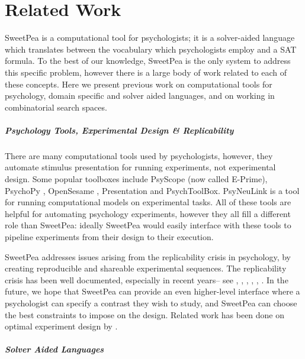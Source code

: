 

\chapter{Related Work}

SweetPea is a computational tool for psychologists; it is a solver-aided language which translates between the vocabulary which psychologists employ and a SAT formula. To the best of our knowledge, SweetPea is the only system to address this specific problem, however there is a large body of work related to each of these concepts. Here we present previous work on computational tools for psychology, domain specific and solver aided languages, and on working in combinatorial search spaces.

\paragraph*{Psychology Tools, Experimental Design \& Replicability}

There are many computational tools used by psychologists, however, they automate stimulus presentation for running experiments, not experimental design. Some popular toolboxes include PsyScope \cite{cohen1993psyscope} (now called E-Prime), PsychoPy \cite{mathot2012opensesame}, OpenSesame \cite{peirce2009generating}, Presentation and PsychToolBox. PsyNeuLink is a tool for running computational models on experimental tasks. All of these tools are helpful for automating psychology experiments, however they all fill a different role than SweetPea: ideally SweetPea would easily interface with these tools to pipeline experiments from their design to their execution.

SweetPea addresses issues arising from the replicability crisis in psychology, by creating reproducible and shareable experimental sequences. The replicability crisis has been well documented, especially in recent years-- see  \cite{pashler2012editors}, \cite{pashler2012replicability}, \cite{simons2014value}, \cite{schmidt2016crisis},  \cite{maxwell2015psychology}, \cite{stroebe2016most}.
In the future, we hope that SweetPea can provide an even higher-level interface where a psychologist can specify a contrast they wish to study, and SweetPea can choose the best constraints to impose on the design. Related work has been done on optimal experiment design by \cite{myung2009optimal}.


\paragraph*{Solver Aided Languages}

